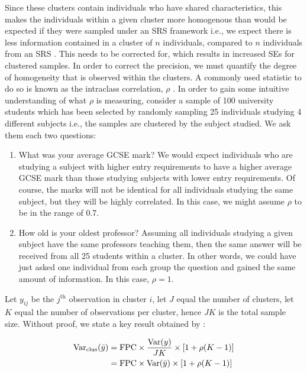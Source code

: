 Since these clusters contain individuals who have shared characteristics, this makes the individuals within a given cluster more homogenous than would be expected if they were sampled under an SRS framework i.e., we expect there is less information contained in a cluster of $n$ individuals, compared to $n$ individuals from an SRS \citep{heeringa2017}. This needs to be corrected for, which results in increased SEs for clustered samples. In order to correct the precision, we must quantify the degree of homogeneity that is observed within the clusters. A commonly used statistic to do so is known as the intraclass correlation, $\rho$ \citep{kish1965}. In order to gain some intuitive understanding of what $\rho$ is measuring, consider a sample of 100 university students which has been selected by randomly sampling 25 individuals studying 4 different subjects i.e., the samples are clustered by the subject studied. We ask them each two questions:

\begin{enumerate}
\item What was your average GCSE mark? We would expect individuals who are studying a subject with higher entry requirements to have a higher average GCSE mark than those studying subjects with lower entry requirements. Of course, the marks will not be identical for all individuals studying the same subject, but they will be highly correlated. In this case, we might assume $\rho$ to be in the range of 0.7.
\item How old is your oldest professor? Assuming all individuals studying a given subject have the same professors teaching them, then the same answer will be received from all 25 students within a cluster. In other words, we could have just asked one individual from each group the question and gained the same amount of information. In this case, $\rho = 1$.
\end{enumerate}

Let $y_{ij}$ be the $j^{\text{th}}$ observation in cluster $i$, let $J$ equal the number of clusters, let $K$ equal the number of observations per cluster, hence $JK$ is the total sample size. Without proof, we state a key result obtained by \citet{cochran1977}:

\begin{align}
\label{eq:cochran1}
\text{Var}_{\text{clus}}(\bar{y}) 		&=	\text{FPC} \times \frac{ \text{Var}(y) }{ JK } \times [1 + \rho (K - 1)]	\\
\notag
							&=	\text{FPC} \times \text{Var}(\bar{y}) \times [1 + \rho (K - 1)]
\end{align}

